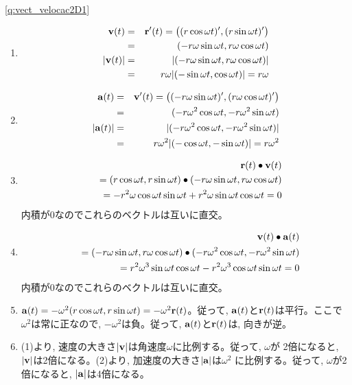\ref{q:vect_velocac2D1}  \
\begin{enumerate}
\item 
\begin{eqnarray*}
{\bf v}(t)&=&{\bf r}'(t)=\bigl((r\cos\omega t)', (r\sin\omega t)'\bigr)\\
         &=&(-r\omega\sin\omega t, r\omega\cos\omega t)\\
|{\bf v}(t)|&=&|(-r\omega\sin\omega t, r\omega\cos\omega t)|\\
            &=&r\omega|(-\sin\omega t, \cos\omega t)|=r\omega
\end{eqnarray*}
\item 
\begin{eqnarray*}
{\bf a}(t)&=&{\bf v}'(t)=\bigl((-r\omega\sin\omega t)', (r\omega\cos\omega t)'\bigr)\\
         &=&(-r\omega^2\cos\omega t, -r\omega^2\sin\omega t)\\
|{\bf a}(t)|&=&|(-r\omega^2\cos\omega t, -r\omega^2\sin\omega t)|\\
            &=&r\omega^2|(-\cos\omega t, -\sin\omega t)|=r\omega^2
\end{eqnarray*}
\item 
\begin{eqnarray*}
&&{\bf r}(t)\bullet{\bf v}(t)\\
&&=(r\cos\omega t, r\sin\omega t)\bullet(-r\omega\sin\omega t, r\omega\cos\omega t)\\
&&=-r^2\omega\cos\omega t\sin\omega t+r^2\omega\sin\omega t\cos\omega t=0
\end{eqnarray*}
内積が0なのでこれらのベクトルは互いに直交。
\item
\begin{eqnarray*}
&&{\bf v}(t)\bullet{\bf a}(t)\\
&&=(-r\omega\sin\omega t, r\omega\cos\omega t)\bullet(-r\omega^2\cos\omega t, -r\omega^2\sin\omega t)\\
&&=r^2\omega^3\sin\omega t\cos\omega t-r^2\omega^3\cos\omega t\sin\omega t=0
\end{eqnarray*}
内積が0なのでこれらのベクトルは互いに直交。
\item ${\bf a}(t)=-\omega^2(r\cos\omega t, r\sin\omega t)=-\omega^2{\bf r}(t)$。従って, ${\bf a}(t)$と${\bf r}(t)$は平行。ここで$\omega^2$は常に正なので, $-\omega^2$は負。従って, ${\bf a}(t)$と${\bf r}(t)$は, 向きが逆。
\vspace{0.1cm}
\item (1)より, 速度の大きさ$|{\bf v}|$は角速度$\omega$に比例する。従って, $\omega$が
2倍になると, $|{\bf v}|$は2倍になる。(2)より, 加速度の大きさ$|{\bf a}|$は$\omega^2$
に比例する。従って, $\omega$が2倍になると, $|{\bf a}|$は4倍になる。
\end{enumerate}
\hv


